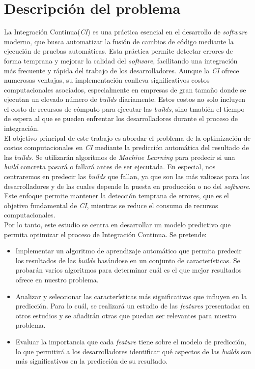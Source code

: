 \section{Descripción del problema}
La Integración Continua(\textit{CI}) es una práctica esencial en el desarrollo de \textit{software}
moderno, que busca automatizar la fusión de cambios de código mediante la ejecución de pruebas
automáticas. Esta práctica permite detectar errores de forma temprana y mejorar la calidad del
\textit{software}, facilitando una integración más frecuente y rápida del trabajo de los
desarrolladores. Aunque la \textit{CI} ofrece numerosas ventajas, su implementación conlleva
significativos costos computacionales asociados, especialmente en empresas de gran tamaño donde
se ejecutan un elevado número de \textit{builds} diariamente. Estos costos no solo incluyen el
costo de recursos de cómputo para ejecutar las \textit{builds}, sino tmabién el tiempo de espera
al que se pueden enfrentar los desarrolladores durante el proceso de integración. \\

El objetivo principal de este trabajo es abordar el problema de la optimización de costos
computacionales en \textit{CI} mediante la predicción automática del resultado de las
\textit{builds}. Se utilizarán algoritmos de \textit{Machine Learning} para predecir si una
\textit{build} concreta pasará o fallará antes de ser ejecutada. En especial, nos centraremos
en predecir las \textit{builds} que fallan, ya que son las más valiosas para los desarrolladores
y de las cuales depende la puesta en producción o no del \textit{software}. Este enfoque
permite mantener la detección temprana de errores, que es el objetivo fundamental de \textit{CI},
mientras se reduce el consumo de recursos computacionales.\\

Por lo tanto, este estudio se centra en desarrollar un modelo predictivo que permita optimizar
el proceso de Integración Continua. Se pretende:

\begin{itemize}
    \item Implementar un algoritmo de aprendizaje automático que permita predecir los resultados
    de las \textit{builds} basándose en un conjunto de características. Se probarán varios
    algoritmos para determinar cuál es el que mejor resultados ofrece en nuestro problema.\\
    \item Analizar y seleccionar las características más significativas que influyen en la
    predicción. Para lo cuál, se realizará un estudio de las \textit{features} presentadas en
    otros estudios y se añadirán otras que puedan ser relevantes para nuestro problema.\\
    \item Evaluar la importancia que cada \textit{feature} tiene sobre el modelo de predicción, lo
    que permitirá a los desarrolladores identificar qué aspectos de las \textit{builds} son
    más significativos en la predicción de su resultado.
\end{itemize}

